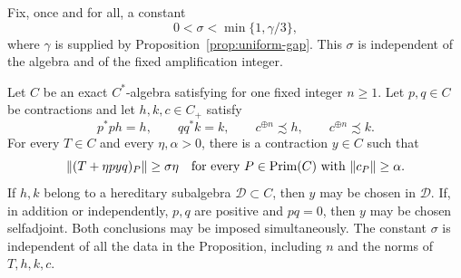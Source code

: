 Fix, once and for all, a constant
\begin{equation}
 0<\sigma<\min\{1,\gamma/3\},
 \label{eq:perturbation-constant}
\end{equation}
where \(\gamma\) is supplied by Proposition~\ref{prop:uniform-gap}.
This \(\sigma\) is independent of the algebra and of the fixed
amplification integer.

\begin{proposition}\label{prop:perturbation}
Let \(C\) be an exact \(C^*\)-algebra satisfying \propF{} for one
fixed integer \(n\geq1\).  Let \(p,q\in C\) be contractions and
let \(h,k,c\in C_+\) satisfy
\begin{equation}
 p^*ph=h,\qquad qq^*k=k,\qquad
 c^{\oplus n}\precsim h,\qquad c^{\oplus n}\precsim k.
 \label{eq:perturbation-hypotheses}
\end{equation}
For every \(T\in C\) and every \(\eta,\alpha>0\), there is a
contraction \(y\in C\) such that
\begin{equation}
 \|(T+\eta pyq)_P\|\geq\sigma\eta
 \quad\text{for every }P\in\operatorname{Prim}(C)\text{ with }\|c_P\|\geq\alpha.
 \label{eq:perturbation-conclusion}
\end{equation}
If \(h,k\) belong to a hereditary subalgebra
\(\mathcal D\subset C\), then \(y\) may be chosen in \(\mathcal D\).
If, in addition or independently, \(p,q\) are positive and \(pq=0\),
then \(y\) may be chosen selfadjoint.  Both conclusions may be
imposed simultaneously.  The constant \(\sigma\) is independent
of all the data in the Proposition, including \(n\) and the norms
of \(T,h,k,c\).
\end{proposition}

